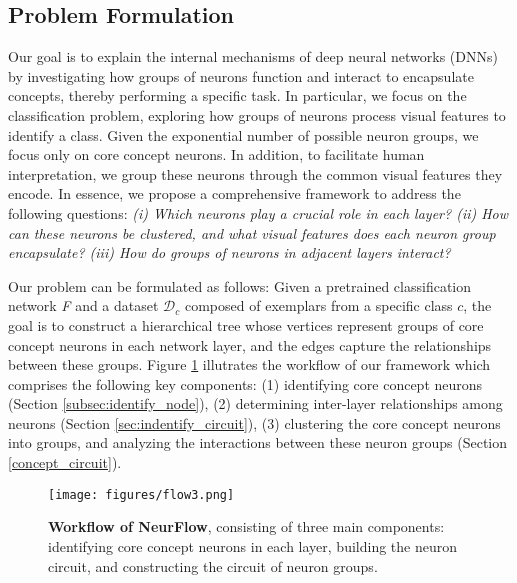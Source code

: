 \subsection{Problem Formulation}
Our goal is to explain the internal mechanisms of deep neural networks (DNNs) by investigating how groups of neurons function and interact to encapsulate concepts, thereby performing a specific task. In particular, we focus on the classification problem, exploring how groups of neurons process visual features to identify a class. Given the exponential number of possible neuron groups, we focus only on core concept neurons. 
In addition, to facilitate human interpretation, we group these neurons through the common visual features they encode.
In essence, we propose a comprehensive framework to address the following questions: 
\textit{(i) Which neurons play a crucial role in each layer? (ii) How can these neurons be clustered, and what visual features does each neuron group encapsulate? (iii) How do groups of neurons in adjacent layers interact?}


Our problem can be formulated as follows:
Given a pretrained classification network \textit{F} and a dataset $\mathcal{D}_c$ composed of exemplars from a specific class $c$, the goal is to construct a hierarchical tree whose vertices represent groups of core concept neurons in each network layer, and the edges capture the relationships between these groups.
Figure \ref{fig:flow} illutrates the workflow of our framework which comprises the following key components: (1) identifying core concept neurons (Section \ref{subsec:identify_node}), (2) determining inter-layer relationships among neurons (Section \ref{sec:indentify_circuit}), (3) clustering the core concept neurons into groups, and analyzing the interactions between these neuron groups (Section \ref{concept_circuit}). 

\begin{figure}[tb] 
\begin{center}
\vspace{-11mm}
\texttt{[image: figures/flow3.png]} 
\end{center}
\vspace{-15pt} 
\caption{\textbf{Workflow of NeurFlow}, consisting of three main components: identifying core concept neurons in each layer, building the neuron circuit, and constructing the circuit of neuron groups.}
\label{fig:flow}
\vspace{-15pt}
\end{figure}

